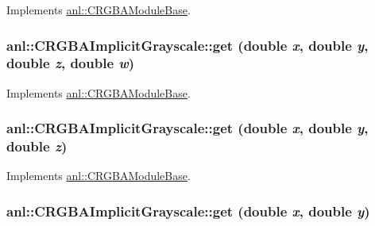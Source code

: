 Implements \hyperlink{classanl_1_1CRGBAModuleBase_aa5a0b719101302596a697aa8c2292f55}{anl::CRGBAModuleBase}.\hypertarget{classanl_1_1CRGBAImplicitGrayscale_a56a233389828df6244a7dbad5722d059}{
\subsubsection[{get}]{ anl::CRGBAImplicitGrayscale::get (double {\em x}, \/  double {\em y}, \/  double {\em z}, \/  double {\em w})}}
\label{classanl_1_1CRGBAImplicitGrayscale_a56a233389828df6244a7dbad5722d059}


Implements \hyperlink{classanl_1_1CRGBAModuleBase_ab94523074ef298bb99f0830051e78c1c}{anl::CRGBAModuleBase}.\hypertarget{classanl_1_1CRGBAImplicitGrayscale_aaa69d1f706bec33d288385fd44c602c7}{
\subsubsection[{get}]{ anl::CRGBAImplicitGrayscale::get (double {\em x}, \/  double {\em y}, \/  double {\em z})}}
\label{classanl_1_1CRGBAImplicitGrayscale_aaa69d1f706bec33d288385fd44c602c7}


Implements \hyperlink{classanl_1_1CRGBAModuleBase_a097897c2d625c824832325260169c90e}{anl::CRGBAModuleBase}.\hypertarget{classanl_1_1CRGBAImplicitGrayscale_a806ae7b00b96c104a926df3de2b9d3fb}{
\subsubsection[{get}]{ anl::CRGBAImplicitGrayscale::get (double {\em x}, \/  double {\em y})}}
\label{classanl_1_1CRGBAImplicitGrayscale_a806ae7b00b96c104a926df3de2b9d3fb}


